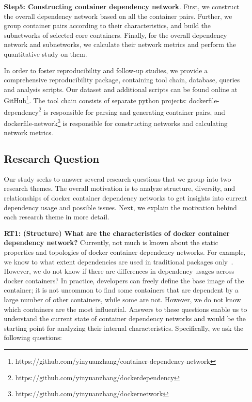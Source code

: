 \documentclass[sigconf]{acmart}
\begin{document}
\noindent\textbf{Step5: Constructing container dependency network}. First, we construct the overall dependency network based on all the container pairs. Further, we group container pairs according to their characteristics, and build the subnetworks of selected core containers. Finally, for the overall dependency network and subnetworks, we calculate their network metrics and perform the quantitative study on them.%




In order to foster reproducibility and follow-up studies, 
we provide a comprehensive reproducibility package, 
containing tool chain, database, queries and analysis scripts. 
Our dataset and additional scripts can be found online at GitHub\footnote{https://github.com/yinyuanzhang/container-dependency-network}.  
The tool chain consists of separate python projects: \textsf{dockerfile-dependency}\footnote{https://github.com/yinyuanzhang/dockerdependency} is responsible for parsing and generating container pairs, and \textsf{dockerfile-network}\footnote{https://github.com/yinyuanzhang/dockernetwork} is responsible for constructing networks and calculating network metrics.%







\subsection{Research Question}
Our study seeks to answer several research questions that we group into two research themes. 
The overall motivation is to analyze structure, diversity, and
relationships of docker container dependency networks to get insights into current dependency usage and possible issues. 
Next, we explain the
motivation behind each research theme in more detail. 

\smallskip
\textbf{RT1: (Structure) What are the characteristics of docker container dependency network?}  
Currently, not much is known about
the static properties and topologies of docker container dependency networks. For example, we know to what extent
dependencies are used in traditional packages only~\cite{decan2019empirical,wittern2016look}. However, we do not know if there are differences in dependency
usages across docker containers? 
In practice, developers can freely define the base image of the container; it is not uncommon to find  some containers that are dependent by a large number of other containers, while some are not.   
However, we do not know which containers are the most influential. Answers to these questions enable
us to understand the current state of container dependency networks
and would be the starting point for analyzing their  
internal characteristics. Specifically, we ask the following questions:
\end{document}
